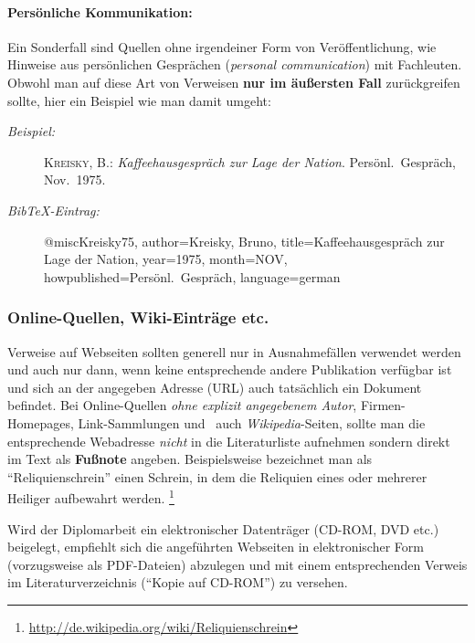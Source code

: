 \paragraph{Persönliche Kommunikation:}
Ein Sonderfall sind Quellen ohne
irgendeiner Form von Veröffentlichung, wie \zB Hinweise aus
persönlichen Gesprächen (\emph{personal communication}) mit Fachleuten.
Obwohl man auf diese Art von Verweisen \textbf{nur im äußersten Fall}
zurückgreifen sollte, hier ein Beispiel wie man damit umgeht:
\nocite{Kreisky75}

\begin{description}
\item[\it Beispiel:] \hfill\break
\textsc{Kreisky, B.}: \emph{Kaffeehausgespräch zur Lage der Nation}.
\newblock Persönl.\ Gespräch, Nov.\ 1975.
\item[\it BibTeX-Eintrag:] \mbox{}\par
%
\begin{GenericCode}
@misc{Kreisky75,
  author={Kreisky, Bruno},
  title={Kaffeehausgespräch zur Lage der Nation},
  year={1975},
  month=NOV,
  howpublished={Persönl.\ Gespräch},
  language={german}
}
\end{GenericCode}
\end{description}

\subsubsection{Online-Quellen, Wiki-Einträge etc.}
\label{sec:OnlneQuellen}
\nocite{Microsoft01}

Verweise auf Webseiten sollten generell nur in Ausnahmefällen
verwendet werden und auch nur dann, wenn keine entsprechende
andere Publikation verfügbar ist und sich an der angegeben Adresse
(URL) auch tatsächlich ein Dokument befindet. Bei Online-Quellen 
\emph{ohne explizit angegebenem Autor}, \zB Firmen-Homepages, 
Link-Sammlungen und \va\ auch \emph{Wikipedia}-Seiten, sollte 
man die entsprechende Webadresse \emph{nicht} in die
Literaturliste aufnehmen sondern direkt im Text als \textbf{Fußnote} 
angeben. Beispielsweise bezeichnet man als "`Reliquienschrein"' einen 
Schrein, in dem die Reliquien eines oder mehrerer Heiliger aufbewahrt werden.%
\footnote{\url{http://de.wikipedia.org/wiki/Reliquienschrein}}

Wird der Diplomarbeit ein elektronischer Datenträger (CD-ROM, DVD
etc.) beigelegt, empfiehlt sich die angeführten Webseiten in
elektronischer Form (vorzugsweise als PDF-Da\-tei\-en) abzulegen
und mit einem entsprechenden Verweis im Literaturverzeichnis
("`Kopie auf CD-ROM"') zu versehen.


